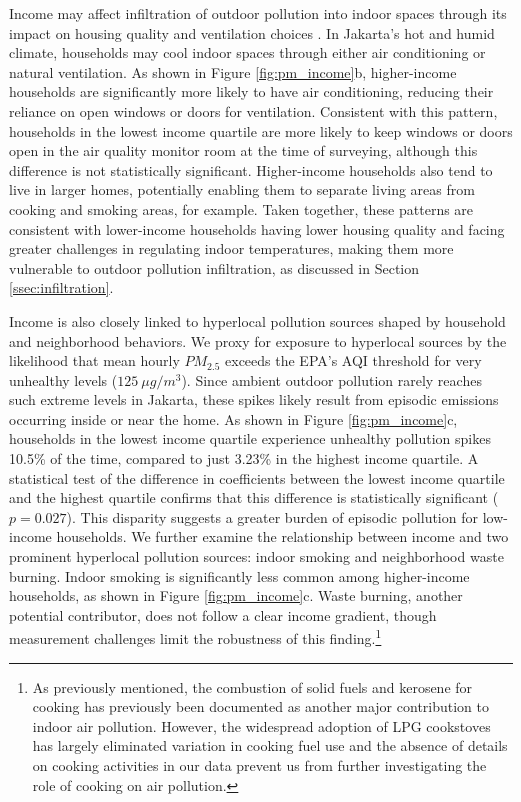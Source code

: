 \documentclass[9pt,twocolumn,twoside]{pnas-new}
\begin{document}
Income may affect infiltration of outdoor pollution into indoor spaces through its impact on housing quality and ventilation choices \citep{lunderberg_assessing_2023}. In Jakarta’s hot and humid climate, households may cool indoor spaces through either air conditioning or natural ventilation. As shown in Figure \ref{fig:pm_income}b, higher-income households are significantly more likely to have air conditioning, reducing their reliance on open windows or doors for ventilation. Consistent with this pattern, households in the lowest income quartile are more likely to keep windows or doors open in the air quality monitor room at the time of surveying, although this difference is not statistically significant. Higher-income households also tend to live in larger homes, potentially enabling them to separate living areas from cooking and smoking areas, for example. Taken together, these patterns are consistent with lower-income households having lower housing quality and facing greater challenges in regulating indoor temperatures, making them more vulnerable to outdoor pollution infiltration, as discussed in Section \ref{ssec:infiltration}.

Income is also closely linked to hyperlocal pollution sources shaped by household and neighborhood behaviors. We proxy for exposure to hyperlocal sources by the likelihood that mean hourly $PM_{2.5}$ exceeds the EPA's AQI threshold for very unhealthy levels ($125~\mu g / m^3$). Since ambient outdoor pollution rarely reaches such extreme levels in Jakarta, these spikes likely result from episodic emissions occurring inside or near the home. 
%
As shown in Figure \ref{fig:pm_income}c, households in the lowest income quartile experience unhealthy pollution spikes 10.5\% of the time, compared to just 3.23\% in the highest income quartile. A statistical test of the difference in coefficients between the lowest income quartile and the highest quartile confirms that this difference is statistically significant ($p = 0.027$). This disparity suggests a greater burden of episodic pollution for low-income households.
%
We further examine the relationship between income and two prominent hyperlocal pollution sources: indoor smoking and neighborhood waste burning. Indoor smoking is significantly less common among higher-income households, as shown in Figure \ref{fig:pm_income}c. Waste burning, another potential contributor, does not follow a clear income gradient, though measurement challenges limit the robustness of this finding.\footnote{As previously mentioned, the combustion of solid fuels and kerosene for cooking has previously been documented as another major contribution to indoor air pollution. However, the widespread adoption of LPG cookstoves has largely eliminated variation in cooking fuel use and the absence of details on cooking activities in our data prevent us from further investigating the role of cooking on air pollution.
}
\end{document}

